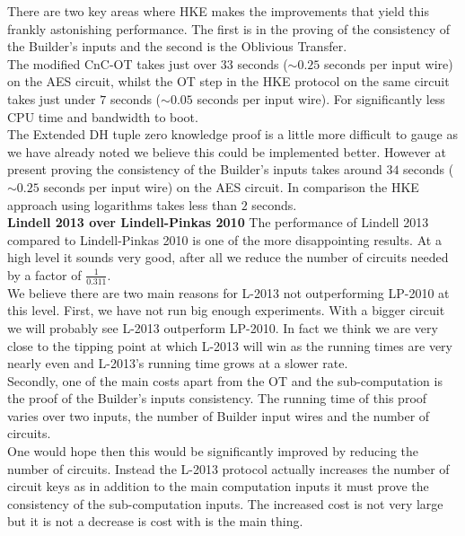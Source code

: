 \documentclass[ %
                    author={Nicholas Tutte},
                supervisor={Prof. Nigel Smart},
                    degree={MEng},
                     title={Secure Two Party Computation},
                  subtitle={A practical comparison of recent protocols},
                      type={Research - GG1K},
                      year={2015} ]{dissertation}
\begin{document}
					There are two key areas where HKE makes the improvements that yield this frankly astonishing performance. The first is in the proving of the consistency of the Builder's inputs and the second is the Oblivious Transfer.\\

					The modified CnC-OT takes just over $33$ seconds ($\sim 0.25$ seconds per input wire) on the AES circuit, whilst the OT step in the HKE protocol on the same circuit takes just under $7$ seconds ($\sim 0.05$ seconds per input wire). For significantly less CPU time and bandwidth to boot.\\

					The Extended DH tuple zero knowledge proof is a little more difficult to gauge as we have already noted we believe this could be implemented better. However at present proving the consistency of the Builder's inputs takes around $34$ seconds ($\sim 0.25$ seconds per input wire) on the AES circuit. In comparison the HKE approach using logarithms takes less than $2$ seconds.\\

					\noindent \textbf{Lindell 2013 over Lindell-Pinkas 2010} The performance of Lindell 2013 compared to Lindell-Pinkas 2010 is one of the more disappointing results. At a high level it sounds very good, after all we reduce the number of circuits needed by a factor of $\frac{1}{0.311}$.\\

					We believe there are two main reasons for L-2013 not outperforming LP-2010 at this level. First, we have not run big enough experiments. With a bigger circuit we will probably see L-2013 outperform LP-2010. In fact we think we are very close to the tipping point at which L-2013 will win as the running times are very nearly even and L-2013's running time grows at a slower rate.\\

					Secondly, one of the main costs apart from the OT and the sub-computation is the proof of the Builder's inputs consistency. The running time of this proof varies over two inputs, the number of Builder input wires and the number of circuits.\\

					One would hope then this would be significantly improved by reducing the number of circuits.
					Instead the L-2013 protocol actually increases the number of circuit keys as in addition to the main computation inputs it must prove the consistency of the sub-computation inputs. The increased cost is not very large but it is not a decrease is cost with is the main thing.\\
\end{document}
